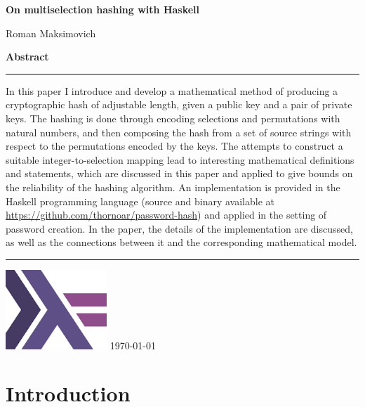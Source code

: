 \documentclass[12pt, a4paper]{article}
\begin{document}

\thispagestyle{empty}
\vspace*{.6in}
{ \Huge\bfseries On multiselection hashing with Haskell }\par
\vspace*{.1in}
{ \Large Roman Maksimovich }
\par
\vspace*{3.5in}
{ \Large\bfseries Abstract }\par
\vspace*{.1in}
\hrule
\vspace*{.1in}
\begin{minipage}{0.9\textwidth}
    In this paper I introduce and develop a mathematical method of producing a cryptographic hash of adjustable length, given a public key and a pair of private keys. The hashing is done through encoding selections and permutations with natural numbers, and then composing the hash from a set of source strings with respect to the permutations encoded by the keys. The attempts to construct a suitable integer-to-selection mapping lead to interesting mathematical definitions and statements, which are discussed in this paper and applied to give bounds on the reliability of the hashing algorithm. An implementation is provided in the Haskell programming language (source and binary available at \url{https://github.com/thornoar/password-hash}) and applied in the setting of password creation. In the paper, the details of the implementation are discussed, as well as the connections between it and the corresponding mathematical model.
\end{minipage}
\vspace*{.1in}
\hrule
\vspace*{.2in}
\begin{center}
    \includegraphics[width = 1.5in]{./figures/haskell.png}
    \vfill
    \today
\end{center}

\newpage
\tableofcontents
\newpage

\section{Introduction}
\end{document}
